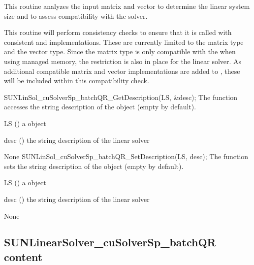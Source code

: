 {
  This routine analyzes the input matrix and vector to determine the
  linear system size and to assess compatibility with the solver.

  This routine will perform consistency checks to ensure that it is
  called with consistent {\nvector} and {\sunmatrix} implementations.
  These are currently limited to the {\sunmatsparse} matrix type
  and the {\nveccuda} vector type. Since the {\sunmatsparse} matrix
  type is only compatible with the {\nveccuda} when using managed memory,
  the restriction is also in place for the linear solver. As additional
  compatible matrix and vector implementations are added to {\sundials},
  these will be included within this compatibility check.
}
%
%
{
  SUNLinSol\_cuSolverSp\_batchQR\_GetDescription(LS, \&desc);
}
{
  The function 
  accesses the string description of the object (empty by default).
}
{
  \begin{args}[options]
  \item[LS] ()
    a  object
  \item[desc] ()
    the string description of the linear solver
  \end{args}
}
{ None }
{}
{
  SUNLinSol\_cuSolverSp\_batchQR\_SetDescription(LS, desc);
}
{
  The function 
  sets the string description of the object (empty by default).
}
{
  \begin{args}[options]
  \item[LS] ()
    a  object
  \item[desc] ()
    the string description of the linear solver
  \end{args}
}
{ None }
{}

\subsection{SUNLinearSolver\_cuSolverSp\_batchQR content}\label{ss:sunlinsol_cuspbqr_content}

